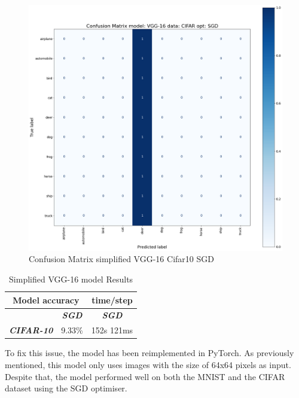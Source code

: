 \documentclass[conference]{IEEEtran}
\begin{document}
\begin{figure}[!htbp]
    \centering
    \includegraphics[scale=0.10]{img/matrix_VGG_CIFAR_SGD.png}
    \caption{Confusion Matrix simplified VGG-16 Cifar10 SGD}
    \label{fig:x matrix_VGG_CIFAR_SGD}
\end{figure}

\begin{table}[!htbp]
    \caption{Simplified VGG-16 model Results}
    \begin{center}
    \begin{tabular}{|c|c|c|}
    \cline{1-3} 
    \multicolumn{2}{|c|}{\textbf{Model accuracy}} & \multicolumn{1}{|c|}{\textbf{time/step}} \\
    \hline 
    \textit{}  & \textbf{\textit{SGD}}  & \textbf{\textit{SGD}} \\
    \hline
    \textbf{\textit{CIFAR-10}} & 9.33\% & 152s 121ms \\
    \cline{1-3} 
    \end{tabular}
    \label{tab: VGG model accuracy}
    \end{center}
\end{table}

To fix this issue, the model has been reimplemented in PyTorch.
As previously mentioned, this model only uses images with the size of 64x64 pixels as input.
Despite that, the model performed well on both the MNIST and the CIFAR dataset using the SGD optimiser. 
\end{document}
